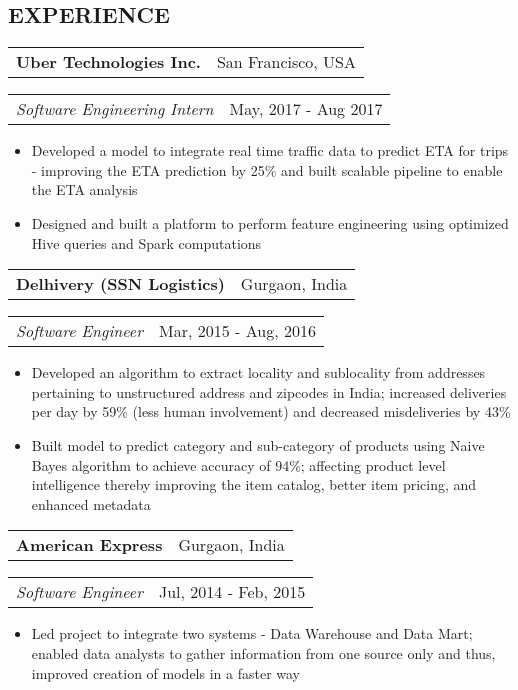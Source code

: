 \documentclass[10.5pt]{article}
\makeatletter
\newenvironment{subs}
  {\adjustwidth{1em}{0pt}}
  {\endadjustwidth}
\newcommand{\headerrow}[2]
{\begin{tabular*}{\linewidth}{l@{\extracolsep{\fill}}r}
	#1 &
	#2 \\
\end{tabular*}}
\makeatother
\begin{document}
\subsection*{\textbf{EXPERIENCE}}
\begin{subs}
\vspace{-5pt}
\headerrow
		{\textbf{Uber Technologies Inc.}}
                {San Francisco, USA}
\vspace{5pt}
\headerrow
               {\textit{Software Engineering Intern}}
               {May, 2017 - Aug 2017}
\vspace{-15pt}
\begin{itemize}[noitemsep,topsep=0pt]
\item Developed a model to integrate real time traffic data to predict ETA for trips - improving the ETA prediction by 25\% and built scalable pipeline to enable the ETA analysis
\item Designed and built a platform to perform feature engineering using optimized Hive queries and Spark computations  
\end{itemize}
\vspace{3pt}
\headerrow
		{\textbf{Delhivery (SSN Logistics)}}
                {Gurgaon, India}
\vspace{5pt}
\headerrow
               {\textit{Software Engineer}}
               {Mar, 2015 - Aug, 2016}
\vspace{-15pt}
\begin{itemize}[noitemsep,topsep=0pt]
\item Developed an algorithm to extract locality and sublocality from addresses pertaining to unstructured address and zipcodes in India; increased deliveries per day by 59\% (less human involvement) and decreased misdeliveries by 43\%
\item Built model to predict category and sub-category of products using Naive Bayes algorithm to achieve accuracy of 94\%; affecting product level intelligence thereby improving the item catalog, better item pricing, and enhanced metadata
\end{itemize}
\vspace{3pt}
\headerrow
		{\textbf{American Express}}
                {Gurgaon, India}
\vspace{5pt}
\headerrow
               {\textit{Software Engineer}}
               {Jul, 2014 - Feb, 2015}
\vspace{-15pt}
\begin{itemize}[noitemsep,topsep=0pt]
\item Led project to integrate two systems - Data Warehouse and Data Mart; enabled data analysts to gather information from one source only and thus, improved creation of models in a faster way

\end{itemize}
\end{subs}
\end{document}
